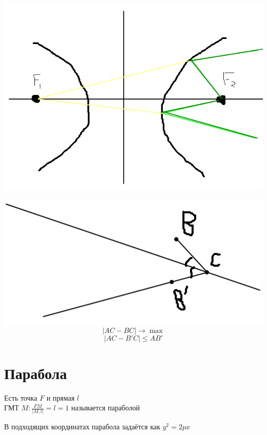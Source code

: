 \begin{theorem}
    \includegraphics[scale=0.4]{2}
\end{theorem}

\begin{lemma}
	\includegraphics[scale=0.4]{3}
    $$ |AC - BC | \to \max $$
    $$ |AC - B'C | \le AB' $$
\end{lemma}

\section{Парабола}

\begin{definition}
	Есть точка $F$ и  прямая $l$ \\
    ГМТ $ M : \frac{FM}{|M, l|} = l = 1 $ называется параболой
\end{definition}

\begin{definition}
	В подходящих координатах парабола задаётся как $ y^2 = 2px $
\end{definition}


